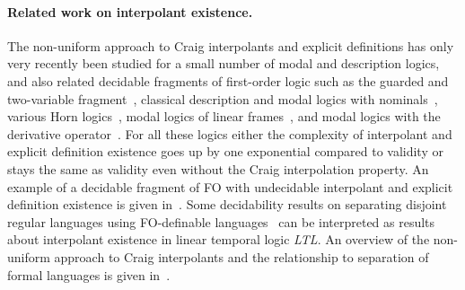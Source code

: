 \documentclass[10pt,a4paper]{amsart}
\theoremstyle{plain}
\theoremstyle{definition}
\newcommand{\nz}[1]{\textcolor{blue}{\bf!}%
	\marginpar[\parbox{15mm}{\raggedleft\scriptsize\textcolor{blue}{#1}}]%
	{\parbox{15mm}{\raggedright\scriptsize\textcolor{blue}{#1}}}}
\newcommand{\LTL}{\textsl{LTL}}
\begin{document}
\paragraph{Related work on interpolant existence.}
%
The non-uniform approach to Craig interpolants and explicit definitions has only very recently been studied for a small number of modal and description logics, and also related decidable fragments of first-order logic such as the guarded and two-variable fragment~\cite{DBLP:conf/lics/JungW21}, classical description and modal logics with nominals~\cite{DBLP:journals/tocl/ArtaleJMOW23},
various Horn logics~\cite{DBLP:series/synthesis/2016Benedikt,DBLP:journals/corr/abs-2202-07186}, modal logics of linear frames~\cite{DBLP:journals/corr/abs-2312-05929}, and modal logics with the derivative operator~\cite{DBLP:journals/corr/abs-2403-11255}. For all these logics either the complexity of interpolant and explicit definition existence goes up by one exponential compared to validity or stays the same as validity even without the Craig interpolation property. An example of a decidable fragment of FO with undecidable interpolant and explicit definition existence is given in~\cite{DL24:undecidability}. 
Some decidability results on separating disjoint regular languages using FO-definable languages~\cite{henkell1,henkell2,DBLP:journals/corr/PlaceZ14} can be interpreted as results about interpolant existence in linear temporal logic \LTL{}. An overview of the non-uniform approach to Craig interpolants and the relationship to separation of formal languages is given in~\cite{chapter:separation}.
\end{document}
